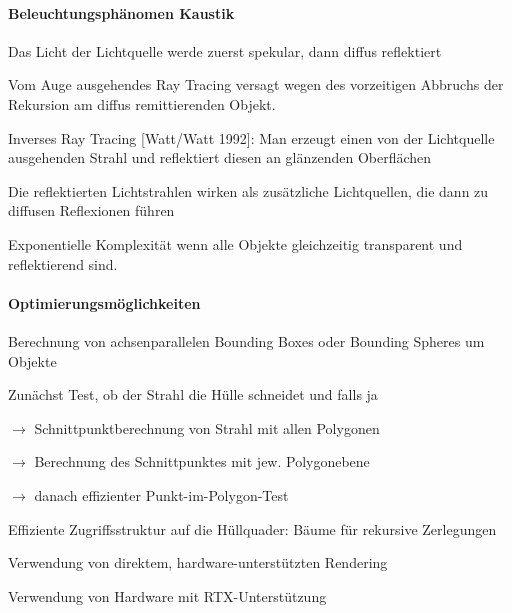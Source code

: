 \documentclass[landscape]{article}
\begin{document}
\begin{multicols}{3}
  \paragraph{Beleuchtungsphänomen Kaustik}
  \begin{itemize*}
    \item Das Licht der Lichtquelle werde zuerst spekular, dann diffus reflektiert
    \item Vom Auge ausgehendes Ray Tracing versagt wegen des vorzeitigen Abbruchs der Rekursion am diffus remittierenden Objekt.
    \item Inverses Ray Tracing [Watt/Watt 1992]: Man erzeugt einen von der Lichtquelle ausgehenden Strahl und reflektiert diesen an glänzenden Oberflächen
    \item Die reflektierten Lichtstrahlen wirken als zusätzliche Lichtquellen, die dann zu diffusen Reflexionen führen
    \item Exponentielle Komplexität wenn alle Objekte gleichzeitig transparent und reflektierend sind.
  \end{itemize*}
  
  \paragraph{Optimierungsmöglichkeiten}
  \begin{itemize*}
    \item Berechnung von achsenparallelen Bounding Boxes oder Bounding Spheres um Objekte
    \item Zunächst Test, ob der Strahl die Hülle schneidet und falls ja
    \item $\rightarrow$ Schnittpunktberechnung von Strahl mit allen Polygonen
    \item $\rightarrow$ Berechnung des Schnittpunktes mit jew. Polygonebene
    \item $\rightarrow$ danach effizienter Punkt-im-Polygon-Test
    \item Effiziente Zugriffsstruktur auf die Hüllquader: Bäume für rekursive Zerlegungen
    \item Verwendung von direktem, hardware-unterstützten Rendering
    \item Verwendung von Hardware mit RTX-Unterstützung
  \end{itemize*}
  

\end{multicols}
\end{document}
